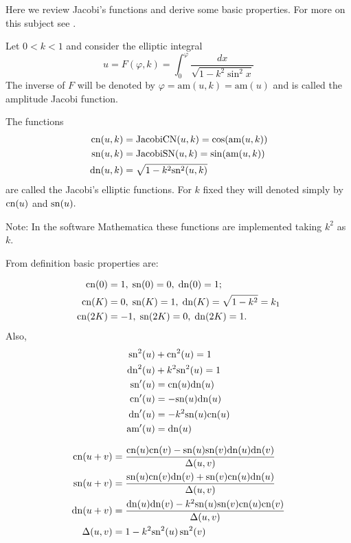\label{app:appD-jacobi-functions}

Here we review Jacobi's functions and derive some basic properties. For more on this subject see \cite{armitage-2006}.

Let $0<k<1$ and consider the elliptic integral
\[u=F(\varphi,k)=\int_{0}^{\varphi} \frac {dx}{\sqrt {1-k^2   \sin^2 x  
}} \]
The inverse of $F$ will be denoted by $\varphi=\text{am}(u,k)=\text{am}(u)$ and is called the amplitude Jacobi function.

The functions
\begin{align*}
 \mathrm{cn}(u,k)&=\mathrm{JacobiCN}(u,k)=\cos(\mathrm{am}(u,k))\\ \;
 \mathrm{sn}(u,k)&=\mathrm{JacobiSN}(u,k)=\sin(\mathrm{am}(u,k))\\
 \mathrm{dn}(u,k)&=\sqrt{1-k^2\mathrm{sn}^2(u,k)}
 \end{align*}
\noindent  are called the Jacobi's elliptic  functions. 
For $k$ fixed they will denoted simply by $\mathrm{cn}(u)$ and $\mathrm{sn}(u).$


\noindent Note: In the software Mathematica these functions are implemented taking $k^2$ as $k$.


From definition basic properties are:

\begin{align*}
\mathrm{cn}(0)&=1,\; \mathrm{sn}(0)=0, \; \mathrm{dn}(0)=1;\\
\mathrm{cn}(K)&=0,\; \mathrm{sn}(K)=1, \; \mathrm{dn}(K)=\sqrt{1-k^2}=k_1\\
\mathrm{cn}(2K)&=-1,\; \mathrm{sn}(2K)=0, \; \mathrm{dn}(2K)=1.
\end{align*}
Also,
\begin{align*}
 \mathrm{sn}^2(u)  &+\mathrm{cn}^2(u) =1\\
 \mathrm{dn}^2 (u)&+k^2\mathrm{sn}^2(u)  =1\\
\mathrm{sn}'(u)&=\mathrm{cn}(u)\mathrm{dn}(u)\\
\mathrm{cn}'(u)&=-\mathrm{sn}(u)\mathrm{dn}(u)\\
\mathrm{dn}'(u)&=-k^2\mathrm{sn}(u)\mathrm{cn}(u)\\
\text{am}'(u)&=\mathrm{dn}(u)
\end{align*}

\begin{align*}
    \mathrm{cn}(u+v)&=\frac{\mathrm{cn}(u)\mathrm{cn}(v)-\mathrm{sn}(u)\mathrm{sn}(v)\mathrm{dn}(u)\mathrm{dn}(v)}{\Delta(u,v)}\\
    \mathrm{sn}(u+v)&=\frac{\mathrm{sn}(u)\mathrm{cn}(v)\mathrm{dn}(v)+\mathrm{sn}(v)\mathrm{cn}(u)\mathrm{dn}(u) }{\Delta(u,v)}\\
    \mathrm{dn}(u+v)&=\frac{\mathrm{dn}(u)\mathrm{dn}(v)-k^2\mathrm{sn}(u)\mathrm{sn}(v)\mathrm{cn}(u)\mathrm{cn}(v) }{\Delta(u,v)}\\
    \Delta(u,v)&=1-k^2\mathrm{sn}^2(u)\,\mathrm{sn}^2(v)
\end{align*}

